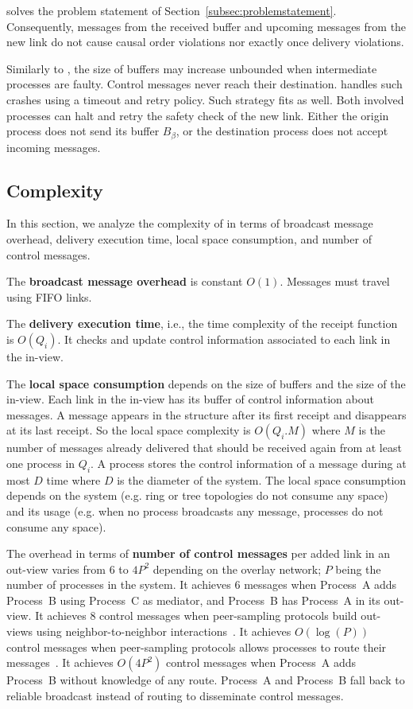 \RPCBROADCAST solves the problem statement of
Section~\ref{subsec:problemstatement}. Consequently, messages from the received
buffer and upcoming messages from the new link do not cause causal order
violations nor exactly once delivery violations.

Similarly to \PCBROADCAST, the size of buffers may increase unbounded when
intermediate processes are faulty. Control messages never reach their
destination. \PCBROADCAST handles such crashes using a timeout and retry
policy. Such strategy fits \RPCBROADCAST as well. Both involved processes can
halt and retry the safety check of the new link. Either the origin process does
not send its buffer $B_\beta$, or the destination process does not accept
incoming messages.

\subsection{Complexity}
\label{subsec:complexity}

In this section, we analyze the complexity of \RPCBROADCAST in terms of
broadcast message overhead, delivery execution time, local space consumption,
and number of control messages. 

\noindent The \textbf{broadcast message overhead} is constant $O(1)$. Messages
must travel using FIFO links.

\noindent The \textbf{delivery execution time}, i.e., the time complexity of the
receipt function is $O(Q_i)$. It checks and update control information
associated to each link in the in-view.

\noindent The \textbf{local space consumption} depends on the size of buffers
and the size of the in-view. Each link in the in-view has its buffer of control
information about messages. A message appears in the structure after its first
receipt and disappears at its last receipt. So the local space complexity is
$O(Q_i.M)$ where $M$ is the number of messages already delivered that should be
received again from at least one process in $Q_i$. A process stores the control
information of a message during at most $D$ time where $D$ is the diameter of
the system. The local space consumption depends on the system (e.g. ring or tree
topologies do not consume any space) and its usage (e.g. when no process
broadcasts any message, processes do not consume any space).

\noindent The overhead in terms of \textbf{number of control messages} per added
link in an out-view varies from $6$ to $4P^2$ depending on the overlay network;
$P$ being the number of processes in the system. It achieves $6$ messages when
Process~A adds Process~B using Process~C as mediator, and Process~B has
Process~A in its out-view.  It achieves $8$ control messages when peer-sampling
protocols build out-views using neighbor-to-neighbor
interactions~\cite{jelasity2007gossip,nedelec2017adaptive}. It achieves
$O(\log(P))$ control messages when peer-sampling protocols allows processes to
route their messages~\cite{jelasity2009tman,stoica2001chord}.  It achieves
$O(4P^2)$ control messages when Process~A adds Process~B without knowledge of
any route. Process~A and Process~B fall back to reliable broadcast instead of
routing to disseminate control messages.

